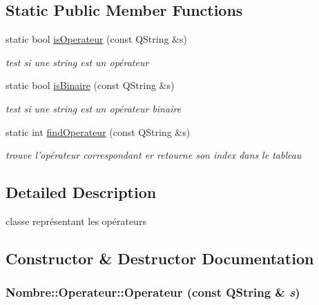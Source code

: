 \subsection*{Static Public Member Functions}
\begin{DoxyCompactItemize}
\item 
static bool \hyperlink{classNombre_1_1Operateur_aa245ad52a4b3adb3727750af78cc1ee3}{isOperateur} (const QString \&s)
\begin{DoxyCompactList}\small\item\em test si une string est un opérateur \item\end{DoxyCompactList}\item 
static bool \hyperlink{classNombre_1_1Operateur_a5fb21bb459b4197a7ea462d212af5809}{isBinaire} (const QString \&s)
\begin{DoxyCompactList}\small\item\em test si une string est un opérateur binaire \item\end{DoxyCompactList}\item 
static int \hyperlink{classNombre_1_1Operateur_aedeab5364cf6164cc18e7e555ffceb9a}{findOperateur} (const QString \&s)
\begin{DoxyCompactList}\small\item\em trouve l'opérateur correspondant er retourne son index dans le tableau \item\end{DoxyCompactList}\end{DoxyCompactItemize}


\subsection{Detailed Description}
classe représentant les opérateurs 

\subsection{Constructor \& Destructor Documentation}
\hypertarget{classNombre_1_1Operateur_a9a922f3e82e5a505ba03c7a7e9ce102f}{
\subsubsection[{Operateur}]{\setlength{\rightskip}{0pt plus 5cm}Nombre::Operateur::Operateur (const QString \& {\em s})}}
\label{classNombre_1_1Operateur_a9a922f3e82e5a505ba03c7a7e9ce102f}


